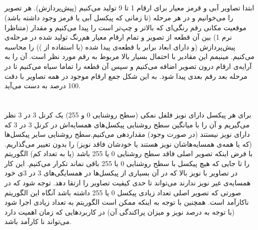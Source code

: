 \documentclass{article}
\begin{document}
\subsection{}
ابتدا تصاویر آبی و قرمز معیار برای ارقام 1 تا 9 تولید می‌کنیم (پیش‌پردازش). هر تصویر را می‌خوانیم و در هر مرحله (تا زمانی که پیکسل آبی یا قرمز وجود داشته باشد) موقعیت مکانی رقم رنگی‌ای که بالاتر و چپ‌تر است را پیدا می‌کنیم و مقدار  (متناظرا نرم 1) بین آن قطعه از تصویر و تمام ارقام معیار هم‌رنگ تولید شده در مرحله‌ی پیش‌پردازش (و دارای ابعاد برابر با قطعه‌ی پیدا شده (با استفاده از )) را محاسبه می‌کنیم. مینیمم این مقادیر با احتمال بسیار بالا مربوط به رقم مورد نظر است. آن را به آرایه‌ی ارقام درون تصویر اضافه می‌کنیم و سپس آن قطعه را تماما سیاه می‌کنیم تا در مرحله بعد رقم بعدی پیدا شود. به این شکل جمع ارقام موجود در همه تصاویر با دقت 100 درصد به دست می‌آید.
\subsection{}
\begin{latin}

\end{latin}
\subsection{}
\begin{latin}

\end{latin}
\subsection{}
\begin{latin}

\end{latin}



\section{}%
\subsection{}
برای هر پیکسل دارای نویز فلفل نمکی (سطح روشنایی 0 و 255) یک کرنل 3 در 3 نظر می‌گیریم و آن را با میانگین سطح روشنایی پیکسل‌های همسایه‌اش در کرنل 3 در 3 که دارای نویز نیستند (در صورت وجود) مقداردهی می‌کنیم.سطح روشنایی سایر پیکسل‌ها (که یا همه‌ی همسایه‌هاشان نویز هستند یا خودشان فاقد نویز) را بدون تغییر می‌گذاریم. با فرض اینکه تصویر اصلی فاقد سطح روشنایی 0 یا 255 باشد (یا به تعداد کم) الگوریتم را تا جایی که هیچ پیکسل با سطح روشنایی 0 یا 255 باقی نماند تکرار می‌کنیم. این کار در تصاویر با نویز بالا که در آن بسیاری از پیکسل‌ها در همسایگی‌های 3 در 3ی خود همسایه‌ی غیر نویز ندارند می‌تواند تا حدی کیفیت تصاویر را ارتقا دهد. توجه شود که در صورتی که تصویر اصلی تعداد زیادی پیکسل 0 یا 255 داشته باشد آنگاه این الگوریتم ناکارآمد است. همچنین با توجه به اینکه ممکن است الگوریتم به تعداد زیادی اجرا شود (با توجه به درصد نویز و میزان پراکندگی آن) در کاربردهایی که زمان اهمیت دارد می‌تواند نا کارآمد باشد.
\end{document}

